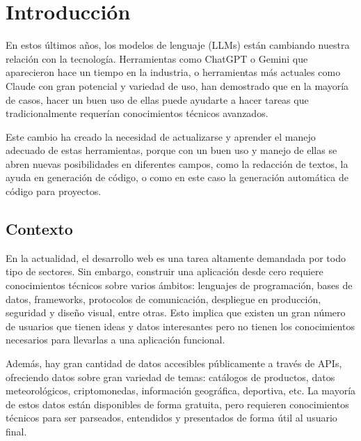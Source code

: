 

\cleardoublepage
\chapter{Introducción}
\label{chap:introduccion}

En estos últimos años, los modelos de lenguaje (LLMs) están cambiando nuestra relación con la tecnología. Herramientas como ChatGPT o Gemini que aparecieron hace un tiempo en la industria, o herramientas más actuales como Claude con gran potencial y variedad de uso, han demostrado que en la mayoría de casos, hacer un buen uso de ellas puede ayudarte a hacer tareas que tradicionalmente requerían conocimientos técnicos avanzados.

Este cambio ha creado la necesidad de actualizarse y aprender el manejo adecuado de estas herramientas, porque con un buen uso y manejo de ellas se abren nuevas posibilidades en diferentes campos, como la redacción de textos, la ayuda en generación de código, o como en este caso la generación automática de código para proyectos.


\section{Contexto}
\label{sec:contexto}

En la actualidad, el desarrollo web es una tarea altamente demandada por todo tipo de sectores.
Sin embargo, construir una aplicación desde cero requiere conocimientos técnicos sobre varios ámbitos: lenguajes de programación, bases de datos, frameworks, protocolos de comunicación, despliegue en producción, seguridad y diseño visual, entre otras. Esto implica que existen un gran número de usuarios que tienen ideas y datos interesantes pero no tienen los conocimientos necesarios para llevarlas a una aplicación funcional.

Además, hay gran cantidad de datos accesibles públicamente a través de APIs, ofreciendo datos sobre gran variedad de temas: catálogos de productos, datos meteorológicos, criptomonedas, información geográfica, deportiva, etc. La mayoría de estos datos están disponibles de forma gratuita, pero requieren conocimientos técnicos para ser parseados, entendidos y presentados de forma útil al usuario final.

